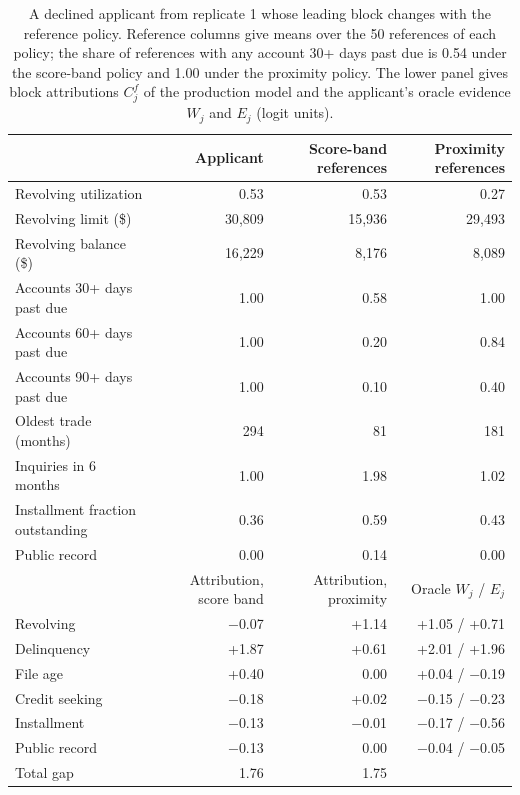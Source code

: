 \begin{table}[t]\centering\small
\caption{A declined applicant from replicate 1 whose leading block changes with the reference policy. Reference columns give means over the 50 references of each policy; the share of references with any account 30+ days past due is 0.54 under the score-band policy and 1.00 under the proximity policy. The lower panel gives block attributions $C^f_j$ of the production model and the applicant's oracle evidence $W_j$ and $E_j$ (logit units).}
\label{tab:case}
\begin{tabular}{@{}lrrr@{}}\toprule
& Applicant & Score-band references & Proximity references\\\midrule
Revolving utilization & 0.53 & 0.53 & 0.27\\
Revolving limit (\$) & 30{,}809 & 15{,}936 & 29{,}493\\
Revolving balance (\$) & 16{,}229 & 8{,}176 & 8{,}089\\
Accounts 30+ days past due & 1.00 & 0.58 & 1.00\\
Accounts 60+ days past due & 1.00 & 0.20 & 0.84\\
Accounts 90+ days past due & 1.00 & 0.10 & 0.40\\
Oldest trade (months) & 294 & 81 & 181\\
Inquiries in 6 months & 1.00 & 1.98 & 1.02\\
Installment fraction outstanding & 0.36 & 0.59 & 0.43\\
Public record & 0.00 & 0.14 & 0.00\\
\midrule & Attribution, score band & Attribution, proximity & Oracle $W_j$ / $E_j$\\\midrule
Revolving & $-$0.07 & +1.14 & +1.05 / +0.71\\
Delinquency & +1.87 & +0.61 & +2.01 / +1.96\\
File age & +0.40 & 0.00 & +0.04 / $-$0.19\\
Credit seeking & $-$0.18 & +0.02 & $-$0.15 / $-$0.23\\
Installment & $-$0.13 & $-$0.01 & $-$0.17 / $-$0.56\\
Public record & $-$0.13 & 0.00 & $-$0.04 / $-$0.05\\
Total gap & 1.76 & 1.75 & \\
\bottomrule\end{tabular}
\end{table}
